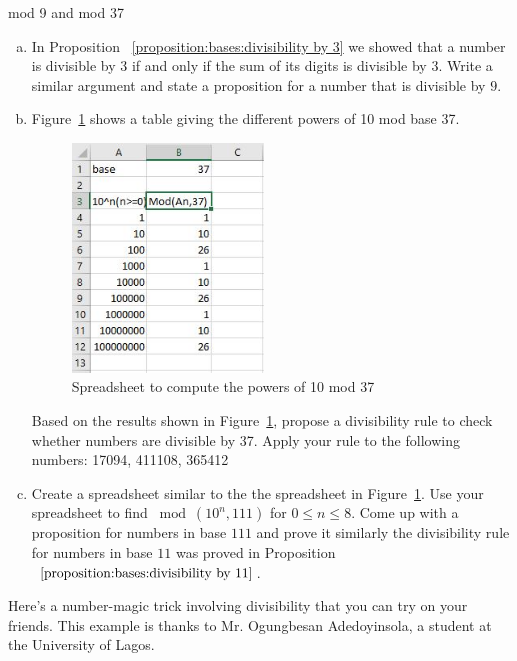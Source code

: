 \begin{exercise}{mod 9 and mod 37}
\begin{enumerate}[(a)]
\item In Proposition ~\ref{proposition:bases:divisibility by 3} we showed that a number is divisible by $3$ if and only if the sum of its digits is divisible by $3$. Write a similar argument  and state a proposition for a number that is divisible by $9$.
\item Figure~\ref{powersOf10Mod37} shows a table giving the different powers of 10 mod base 37. 

\begin{figure}
\begin{center}
\centerline {
\includegraphics[width=2in]{images/divisibility_37}
}
\end{center}
\caption{Spreadsheet to compute the powers of 10 mod 37}
\label{powersOf10Mod37}
\end{figure}

Based on the results shown in Figure~\ref{powersOf10Mod37}, propose a divisibility rule to check whether numbers are divisible by 37. Apply your rule to the following numbers: 17094,   411108, 365412\\

\item Create a spreadsheet similar to the the spreadsheet in Figure~\ref{powersOf10Mod37}. Use your spreadsheet to find $\bmod(10^{n},111)$ for $0\leq n\leq 8$. Come up with a proposition for numbers in base $111$ and prove it similarly  the divisibility rule for numbers in base $11$ was proved in Proposition $~\ref{proposition:bases:divisibility by 11}$.
\end{enumerate}
\end{exercise}

Here's a number-magic trick involving divisibility that you can try on your friends. This example is thanks to Mr. Ogungbesan Adedoyinsola, a student at the University of Lagos.


